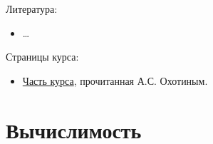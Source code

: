 \documentclass[12pt,a4paper]{article}
\date{}
\begin{document}
    \maketitle

    \listoftodos[TODOs]

    \tableofcontents

    \vspace{2em}
    Литература:
    \begin{itemize}
        \item \dots
    \end{itemize}

    Страницы курса:
    \begin{itemize}
        \item \href{https://users.math-cs.spbu.ru/~okhotin/teaching/tcs_fl_2021/}{Часть курса}, прочитанная А.С. Охотиным.
    \end{itemize}
    
    \section{Вычислимость}
\end{document}
